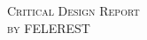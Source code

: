 \begin{titlepage}
	\centering 
    \vspace*{5 cm}
	\textsc{\Large Critical Design Report}\\[0.5 cm]
	
	\textsc{\Large by FELEREST}\\[0.2 cm]
	
\end{titlepage}